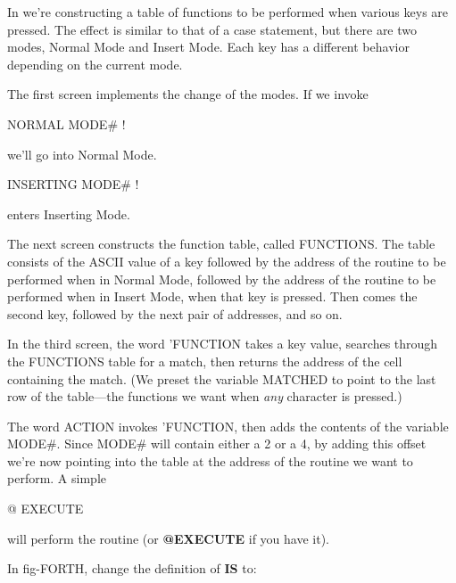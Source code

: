 In  we're constructing a table of functions to be performed
when various keys are pressed. The effect is similar to that of a
case statement, but there are two modes, Normal Mode and Insert Mode.
Each key has a different behavior depending on the current mode.

The first screen implements the change of the modes. If we invoke

\begin{Code}
NORMAL MODE# !
\end{Code}
we'll go into Normal Mode.

\begin{Code}
INSERTING MODE# !
\end{Code}
enters Inserting Mode.

The next screen constructs the function table, called FUNCTIONS.
The table consists of the ASCII value of a key followed by the address of
the routine to be performed when in Normal Mode, followed by the address
of the routine to be performed when in Insert Mode, when that key
is pressed. Then comes the second key, followed by the next pair of
addresses, and so on.

In the third screen, the word 'FUNCTION takes a key value,
searches through the FUNCTIONS table for a match, then returns the
address of the cell containing the match. (We preset the variable
MATCHED to point to the last row of the table---the functions we want
when \emph{any} character is pressed.)

The word ACTION invokes 'FUNCTION, then adds the contents of
the variable MODE\#. Since MODE\# will contain either a 2 or a 4, by
adding this offset we're now pointing into the table at the address
of the routine we want to perform. A simple

\begin{Code}
@ EXECUTE
\end{Code}
will perform the routine (or \textbf{@EXECUTE} if you have it).

In fig-FORTH, change the definition of \textbf{IS} to:

